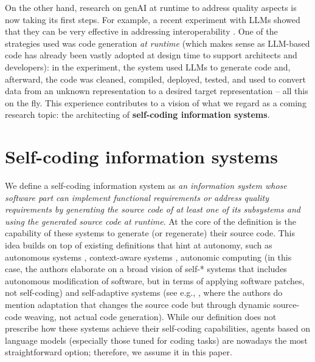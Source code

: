 \documentclass[sigconf]{acmart}
\newcommand{\inlinetodo}[1]{\todo[inline]{#1}}
\theoremstyle{definition}
\newtheorem{definition}{Definition}
\begin{document}
On the other hand, research on genAI at runtime to address quality aspects is now taking its first steps. For example, a recent experiment with LLMs showed that they can be very effective in addressing interoperability \cite{falcao2025evaluating}. One of the strategies used was code generation \textit{at runtime} (which makes sense as LLM-based code has already been vastly adopted at design time to support architects and developers): in the experiment, the system used LLMs to generate code and, afterward, the code was cleaned, compiled, deployed, tested, and used to convert data from an unknown representation to a desired target representation -- all this on the fly. This experience contributes to a vision of what we regard as a coming research topic: the architecting of \textbf{self-coding information systems}.





\section{Self-coding information systems}\label{sec:whatis}

We define a self-coding information system as \textit{an information system whose software part can implement functional requirements or address quality requirements by generating the source code of at least one of its subsystems and using the generated source code at runtime}. At the core of the definition is the capability of these systems to generate (or regenerate) their source code. This idea builds on top of existing definitions that hint at autonomy, such as autonomous systems \cite{rasmus2023autonomous}, context-aware systems \cite{schilit1994context}, autonomic computing \cite{kephart2003vision} (in this case, the authors elaborate on a broad vision of self-* systems that includes autonomous modification of software, but in terms of applying software patches, not self-coding) and self-adaptive systems (see e.g., \cite{cheng2008software}, where the authors do mention adaptation that changes the source code but through dynamic source-code weaving, not actual code generation). While our definition does not prescribe how these systems achieve their self-coding capabilities, agents based on language models (especially those tuned for coding tasks) are nowadays the most straightforward option; therefore, we assume it in this paper.
\end{document}
